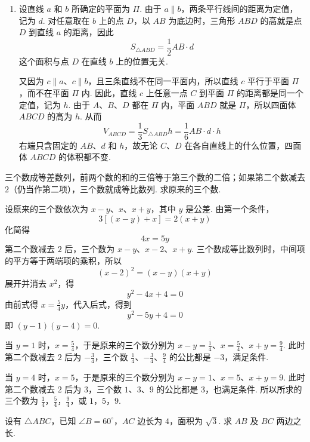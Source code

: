 \documentclass[UTF8,a4paper,oneside,11pt]{ctexbook}
\begin{document}
\begin{solution}
\begin{enumerate}
\item 设直线 \(a\) 和 \(b\) 所确定的平面为 \(\Pi\). 由于 \(a\parallel b\)，两条平行线间的距离为定值，记为 \(d\). 对任意取在 \(b\) 上的点 \(D\)，以 \(AB\) 为底边时，三角形 \(ABD\) 的高就是点 \(D\) 到直线 \(a\) 的距离，因此
\[
S_{\triangle ABD}=\frac12 AB\cdot d
\]
这个面积与点 \(D\) 在直线 \(b\) 上的位置无关.

又因为 \(c\parallel a\)、\(c\parallel b\)，且三条直线不在同一平面内，所以直线 \(c\) 平行于平面 \(\Pi\)，而不在平面 \(\Pi\) 内. 因此，直线 \(c\) 上任意一点 \(C\) 到平面 \(\Pi\) 的距离都是同一个定值，记为 \(h\). 由于 \(A\)、\(B\)、\(D\) 都在 \(\Pi\) 内，平面 \(ABD\) 就是 \(\Pi\)，所以四面体 \(ABCD\) 的高为 \(h\). 从而
\[
V_{ABCD}=\frac13S_{\triangle ABD}h=\frac16AB\cdot d\cdot h
\]
右端只含固定的 \(AB\)、\(d\) 和 \(h\)，故无论 \(C\)、\(D\) 在各自直线上的什么位置，四面体 \(ABCD\) 的体积都不变.
\end{enumerate}
\end{solution}

\begin{problem}
三个数成等差数列，前两个数的和的三倍等于第三个数的二倍；如果第二个数减去 \(2\)（仍当作第二项），三个数就成等比数列. 求原来的三个数.
\end{problem}

\begin{solution}
设原来的三个数依次为 \(x-y\)、\(x\)、\(x+y\)，其中 \(y\) 是公差. 由第一个条件，
\[
3\left[\left(x-y\right)+x\right]=2\left(x+y\right)
\]
化简得
\[
4x=5y
\]
第二个数减去 \(2\) 后，三个数为 \(x-y\)、\(x-2\)、\(x+y\). 三个数成等比数列时，中间项的平方等于两端项的乘积，所以
\[
\left(x-2\right)^2=\left(x-y\right)\left(x+y\right)
\]
展开并消去 \(x^2\)，得
\[
y^2-4x+4=0
\]
由前式得 \(x=\frac54y\)，代入后式，得到
\[
y^2-5y+4=0
\]
即 \(\left(y-1\right)\left(y-4\right)=0\).

当 \(y=1\) 时，\(x=\frac54\)，于是原来的三个数分别为 \(x-y=\frac14\)、\(x=\frac54\)、\(x+y=\frac94\).
此时第二个数减去 \(2\) 后为 \(-\frac34\)，三个数 \(\frac14\)、\(-\frac34\)、\(\frac94\) 的公比都是 \(-3\)，满足条件.

当 \(y=4\) 时，\(x=5\)，于是原来的三个数分别为 \(x-y=1\)、\(x=5\)、\(x+y=9\).
此时第二个数减去 \(2\) 后为 \(3\)，三个数 \(1\)、\(3\)、\(9\) 的公比都是 \(3\)，也满足条件. 所以所求的三个数为 \(\frac14\)，\(\frac54\)，\(\frac94\)，或 \(1\)，\(5\)，\(9\).
\end{solution}

\begin{problem}
设有 \(\triangle ABC\)，已知 \(\angle B=60^\circ\)，\(AC\) 边长为 \(4\)，面积为 \(\sqrt3\). 求 \(AB\) 及 \(BC\) 两边之长.
\end{problem}
\end{document}
